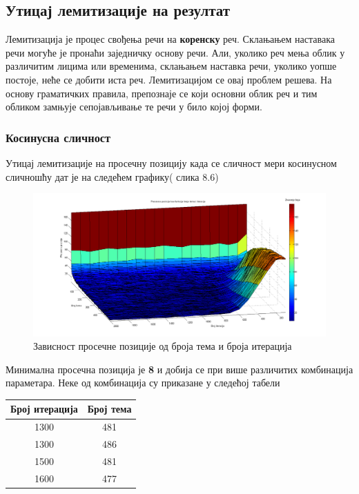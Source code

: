 \subsection{Утицај лемитизације на резултат}

Лемитизација је процес свођења речи на \textbf{коренску} реч. Склањањем наставака речи могуће је пронаћи заједничку основу речи. Али, уколико реч мења облик у различитим лицима или временима, склањањем наставка речи, уколико уопше постоје, неће се добити иста реч. Лемитизацијом се овај проблем решева. На основу граматичких правила, препознаје се који основни облик реч и тим обликом замњује сепојављивање те речи у било којој форми. 




\subsubsection{Косинусна сличност}



Утицај лемитизације на просечну позицију  када се сличност мери косинусном сличношћу дат је на следећем графику( слика 8.6)

		\begin{figure}[H]
    \centering
   \includegraphics[scale=0.3]{./Slike/LemmNoSyn.png} 
	\caption{Зависност просечне позиције од броја тема и броја итерација}
	\label{fig:slika1}
\end{figure}

Минимална просечна позиција је \textbf{8} и добија се при више различитих комбинација параметара. Неке од комбинација су приказане у следећој табели

\begin{center}
\begin{tabular}{|c|c|}
\hline
Број итерација & Број тема \\
\hline\hline
1300 & 481 \\
1300 & 486 \\
1500 & 481 \\
1600 & 477 \\
\hline
\end{tabular}
\end{center}

